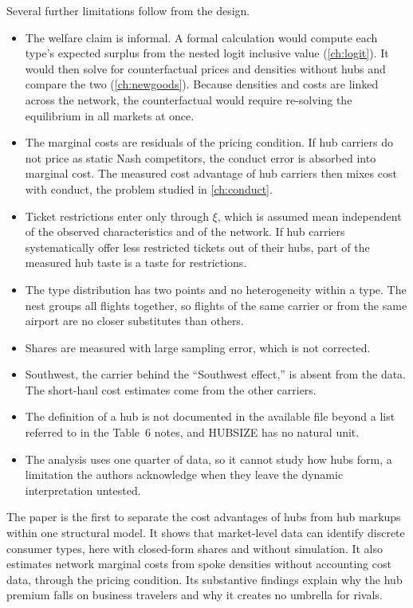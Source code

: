 Several further limitations follow from the design.
\begin{itemize}
  \item The welfare claim is informal. A formal calculation would compute each type's expected surplus from
  the nested logit inclusive value (\cref{ch:logit}). It would then solve for counterfactual prices and
  densities without hubs and compare the two (\cref{ch:newgoods}). Because densities and costs are linked across the
  network, the counterfactual would require re-solving the equilibrium in all markets at once.
  \item The marginal costs are residuals of the pricing condition. If hub carriers do not price as static
  Nash competitors, the conduct error is absorbed into marginal cost. The measured cost advantage of hub
  carriers then mixes cost with conduct, the problem studied in \cref{ch:conduct}.
  \item Ticket restrictions enter only through $\xi$, which is assumed mean independent of the observed
  characteristics and of the network. If hub carriers systematically offer less restricted tickets out of
  their hubs, part of the measured hub taste is a taste for restrictions.
  \item The type distribution has two points and no heterogeneity within a type. The nest groups all flights
  together, so flights of the same carrier or from the same airport are no closer substitutes than others.
  \item Shares are measured with large sampling error, which is not corrected.
  \item Southwest, the carrier behind the ``Southwest effect,'' is absent from the data. The short-haul cost
  estimates come from the other carriers.
  \item The definition of a hub is not documented in the available file beyond a list referred to in the
  Table~6 notes, and HUBSIZE has no natural unit.
  \item The analysis uses one quarter of data, so it cannot study how hubs form, a limitation the authors
  acknowledge when they leave the dynamic interpretation untested.
\end{itemize}

The paper is the first to separate the cost advantages of hubs from hub markups within one structural model.
It shows that market-level data can identify discrete consumer types, here with closed-form shares and
without simulation. It also estimates network marginal costs from spoke densities without accounting cost
data, through the pricing condition. Its substantive findings explain why the hub premium falls on business
travelers and why it creates no umbrella for rivals.

